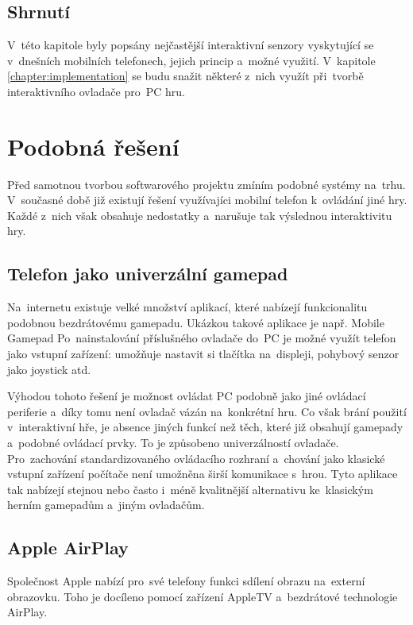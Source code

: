 \documentclass[thesis=B,czech,hidelinks]{FITthesis}[2012/06/26] %
\begin{document}
\section{Shrnutí}

V~této kapitole byly popsány nejčastější interaktivní senzory vyskytující se v~dnešních mobilních telefonech, jejich princip a~možné využití. V~kapitole \ref{chapter:implementation} se budu snažit některé z~nich využít při~tvorbě interaktivního ovladače pro~PC hru. 

\chapter{Podobná řešení}

Před samotnou tvorbou softwarového projektu zmíním podobné systémy na~trhu. V~současné době již existují řešení využívajíci mobilní telefon k~ovládání jiné hry. Každé z~nich však obsahuje nedostatky a~narušuje tak výslednou interaktivitu hry.

\section{Telefon jako univerzální gamepad}

Na~internetu existuje velké množství aplikací, které nabízejí funkcionalitu podobnou bezdrátovému gamepadu. Ukázkou takové aplikace je např. Mobile Gamepad \cite{mobilegamepad} Po~nainstalování příslušného ovladače do~PC je možné využít telefon jako vstupní zařízení: umožňuje nastavit si tlačítka na~displeji, pohybový senzor jako joystick atd.

Výhodou tohoto řešení je možnost ovládat PC podobně jako jiné ovládací periferie a~díky tomu není ovladač vázán na~konkrétní hru. Co však brání použití v~interaktivní hře, je absence jiných funkcí než těch, které již obsahují gamepady a~podobné ovládací prvky. To je způsobeno univerzálností ovladače. Pro~zachování standardizovaného ovládacího rozhraní a~chování jako klasické vstupní zařízení počítače není umožněna širší komunikace s~hrou. Tyto aplikace tak nabízejí stejnou nebo často i~méně kvalitnější alternativu ke~klasickým herním gamepadům a~jiným ovladačům. 


\section{Apple AirPlay}

Společnost Apple nabízí pro~své telefony funkci sdílení obrazu na~externí obrazovku. Toho je docíleno pomocí zařízení AppleTV a~bezdrátové technologie AirPlay\cite{airplay}.
\end{document}
